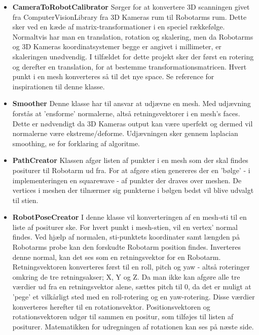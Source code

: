 \begin{itemize}
\item{\textbf{CameraToRobotCalibrator}} \newline
Sørger for at konvertere 3D scanningen givet fra ComputerVisionLibrary fra 3D Kameras rum til Robotarms rum.
Dette sker ved en kæde af matrix-transformationer i en speciel rækkefølge. 
Normaltvis har man en translation, rotation og skalering, men da Robotarms og 3D Kameras koordinatsystemer begge er angivet i millimeter, er skaleringen unødvendig.
I tilfældet for dette projekt sker der først en rotering og derefter en translation, for at bestemme transformationsmatricen. 
Hvert punkt i en mesh konverteres så til det nye space. Se reference \cite{RumTransformation} for inspirationen til denne klasse.

\item{\textbf{Smoother}}\newline
Denne klasse har til ansvar at udjævne en mesh. Med udjævning forstås at 'ensforme' normalerne, altså retningsvektorer i en mesh's faces.
Dette er nødvendigt da 3D Kameras output kan være uperfekt og dermed vil normalerne være ekstreme/deforme. Udjævningen sker gennem laplacian smoothing, se \cite{Smooth} for forklaring af algoritme.

\item{\textbf{PathCreator}}\newline
Klassen afgør listen af punkter i en mesh som der skal findes positurer til Robotarm ud fra.
For at afgøre stien genereres der en 'bølge' - i implementeringen en squarewave - af punkter der draves over meshen.
De vertices i meshen der tilnærmer sig punkterne i bølgen bedst vil blive udvalgt til stien.

\item{\textbf{RobotPoseCreator}}\newline
I denne klasse vil konverteringen af en mesh-sti til en liste af positurer ske.
For hvert punkt i mesh-stien, vil en vertex' normal findes. 
Ved hjælp af normalen, sti-punktets koordinater samt længden på Robotarms probe kan den forskudte Robotarm position findes.
Inverteres denne normal, kan det ses som en retningsvektor for en Robotarm.
Retningsvektoren konverteres først til en roll, pitch og yaw - altså roteringer omkring de tre retningsakser; X, Y og Z.
Da man ikke kan afgøre alle tre værdier ud fra en retningsvektor alene, sættes pitch til 0, da det er muligt at 'pege' et vilkårligt sted med en roll-rotering og en yaw-rotering. Disse værdier konverteres herefter til en rotationsvektor.
Positionsvektoren og rotationsvektoren udgør til sammen en positur, som tilføjes til listen af positurer. Matematikken for udregningen af rotationen kan ses på næste side.
\newpage


\end{itemize}
